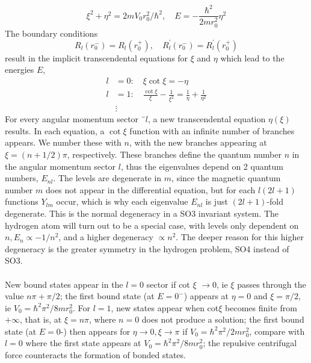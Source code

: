 \begin{equation}
    \xi^{2}+\eta^{2}=2 m V_{0} r_{0}^{2} / \hbar^{2}, \quad E=-\frac{\hbar^{2}}{2 m r_{0}^{2}} \eta^{2}
    \end{equation}
The boundary conditions
\begin{equation}
    R_{l}\left(r_{0}^{-}\right)=R_{l}\left(r_{0}^{+}\right), \quad R_{l}^{\prime}\left(r_{0}^{-}\right)=R_{l}^{\prime}\left(r_{0}^{+}\right)
    \end{equation}
result in the implicit transcendental equations for $\xi$ and $\eta$ which lead to the energies $E$,
\begin{equation}
\begin{aligned} l &=0: \quad \xi \cot \xi=-\eta \\ l &=1: \quad \frac{\cot \xi}{\xi}-\frac{1}{\xi^{2}}=\frac{1}{\eta}+\frac{1}{\eta^{2}} \\ & \vdots \end{aligned}
\end{equation}
For every angular momentum sector $¨l$, a new transcendental equation $\eta(\xi)$ results. In each equation, a $\operatorname{cot} \xi$ function with an infinite number of branches appears. We number these with $n$, with the new branches appearing at $\xi = (n + 1/2) \pi$, respectively. These branches define the quantum number $n$ in the angular momentum sector $l$, thus the eigenvalues ​​depend on 2 quantum numbers, $E_{nl}$. The levels are degenerate in $m$, since the magnetic quantum number $m$ does not appear in the differential equation, but for each $l (2l + 1)$ functions $Y_{lm}$ occur, which is why each eigenvalue $E_{nl}$ is just $(2l + 1)$-fold degenerate. This is the normal degeneracy in a SO3 invariant system. The hydrogen atom will turn out to be a special case, with levels only dependent on $n, E_n \propto -1 / n^2$, and a higher degeneracy $\propto n^2$. The deeper reason for this higher degeneracy is the greater symmetry in the hydrogen problem, SO4 instead of SO3.
\\\\
New bound states appear in the $l = 0$ sector if cot $\xi$ $\rightarrow 0$, ie $\xi$ passes through the value $n\pi + \pi / 2$; the first bound state (at $E = 0^-$) appears at $\eta = 0$ and $\xi = \pi / 2$, ie $V_0 = \hbar^2\pi^2/8mr_0^2$. For $l = 1$, new states appear when cot$\xi$ becomes finite from $+ \infty$, that is, at $\xi = nπ$, where $n = 0$ does not produce a solution; the first bound state (at $E = 0 $-) then appears for $\eta \rightarrow 0, \xi \rightarrow \pi$ if $V_0 = \hbar^2\pi^2/2mr_0^2$, compare with $l = 0$ where the first state appears at $V_0 = \hbar^2\pi^2/8mr_0^2$; the repulsive centrifugal force counteracts the formation of bonded states.

